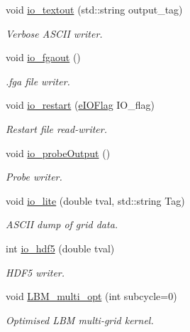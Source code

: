 \begin{DoxyCompactItemize}
void \hyperlink{class_grid_obj_a1f334215b7789ea1ad8e2d1e15c67fb2}{io\+\_\+textout} (std\+::string output\+\_\+tag)
\begin{DoxyCompactList}\small\item\em Verbose A\+S\+C\+II writer. \end{DoxyCompactList}\item 
void \hyperlink{class_grid_obj_aa80aecb06d7a420865c32b8acc15581e}{io\+\_\+fgaout} ()
\begin{DoxyCompactList}\small\item\em .fga file writer. \end{DoxyCompactList}\item 
void \hyperlink{class_grid_obj_a94551d2e383da4b2a2c930488d436a42}{io\+\_\+restart} (\hyperlink{_enumerations_8h_ad1926c22ad82853adff44c4b76b97827}{e\+I\+O\+Flag} I\+O\+\_\+flag)
\begin{DoxyCompactList}\small\item\em Restart file read-\/writer. \end{DoxyCompactList}\item 
void \hyperlink{class_grid_obj_af7e8782f95d15884d761cc4f1d5926c0}{io\+\_\+probe\+Output} ()
\begin{DoxyCompactList}\small\item\em Probe writer. \end{DoxyCompactList}\item 
void \hyperlink{class_grid_obj_acf311bbf350fd48104663eaabebca835}{io\+\_\+lite} (double tval, std\+::string Tag)
\begin{DoxyCompactList}\small\item\em A\+S\+C\+II dump of grid data. \end{DoxyCompactList}\item 
int \hyperlink{class_grid_obj_adc960ac818748b839e81d1375782caa7}{io\+\_\+hdf5} (double tval)
\begin{DoxyCompactList}\small\item\em H\+D\+F5 writer. \end{DoxyCompactList}\item 
void \hyperlink{class_grid_obj_ac65e9a1a8aa854d25281780d6b52665b}{L\+B\+M\+\_\+multi\+\_\+opt} (int subcycle=0)
\begin{DoxyCompactList}\small\item\em Optimised L\+BM multi-\/grid kernel. \end{DoxyCompactList}\end{DoxyCompactItemize}
